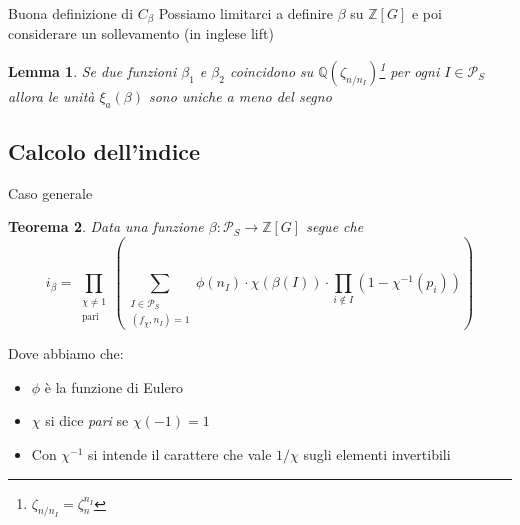 \documentclass{beamer}
\theoremstyle{plain}
\newtheorem{teo}{Teorema}[section]
\newtheorem{lem}[teo]{Lemma}
\theoremstyle{remark}
\theoremstyle{definition}
\newcommand{\PS}{\mathcal{P}_S}
\newcommand{\Z}{\mathbb{Z}}
\newcommand{\Q}{\mathbb{Q}}
\begin{document}
	\begin{frame}{Buona definizione di $C_ \beta $}
		Possiamo limitarci a definire $\beta$ su $ \Z[G] $ e poi considerare un sollevamento (in inglese lift)\\
		\pause
		\begin{lem}
			Se due funzioni $ \beta_1 $ e $ \beta_2 $ coincidono su $ \Q(\zeta_{n/n_I} )$\footnote{$ \zeta_{n/n_I} = \zeta_n^{n_I} $} per ogni $ I \in \PS $ allora le unità $ \xi_a (\beta) $ sono uniche a meno del segno
		\end{lem}
	\end{frame}
	
	\subsection{Calcolo dell'indice}
	
	\begin{frame}{Caso generale}
		\begin{teo}
				Data una funzione $ \beta : \PS \to \Z [G] $ segue che
					\begin{equation}
					\label{eq:idx1}
						i_\beta = \prod_{ \substack{\chi \neq 1 \\ \text{pari}}} \left( \sum_{\substack{ I \in \PS \\ (f_\chi , n_I) = 1}} \phi (n_I) \cdot \chi (\beta (I)) \cdot \prod_{i \not \in  I} (1- \chi^{-1} (p_i)) \right) 
					\end{equation}
		\end{teo}\pause
		Dove abbiamo che:
		\begin{itemize}
			\item $\phi$ è la funzione di Eulero 
			\item $\chi$ si dice \textit{pari} se $ \chi (-1) = 1 $
			\item Con $ \chi^{-1} $ si intende il carattere che vale $ 1/\chi $ sugli elementi invertibili
		\end{itemize}
	\end{frame}	
	
	
	
	
	
	
	
	
	
	
\end{document}
